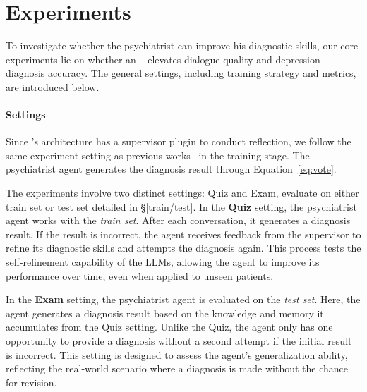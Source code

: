 
\section{Experiments}
\label{sec:exp}


To investigate whether the psychiatrist can improve his diagnostic skills, our core experiments lie on whether an \system~ elevates dialogue quality and depression diagnosis accuracy. The general settings, including training strategy and metrics, are introduced below.


\paragraph{Settings}
Since \system's architecture has a supervisor plugin to conduct reflection, we follow the same experiment setting as previous works~\cite{shinn2023reflexion, renze2024selfreflectionllmagentseffects} in the training stage. The psychiatrist agent generates the diagnosis result through Equation~\ref{eq:vote}.


The experiments involve two distinct settings: Quiz and Exam, evaluate on either train set or test set detailed in \S\ref{train/test}. In the \textbf{Quiz} setting, the psychiatrist agent works with the \textit{train set}. After each conversation, it generates a diagnosis result. If the result is incorrect, the agent receives feedback from the supervisor to refine its diagnostic skills and attempts the diagnosis again. This process tests the self-refinement capability of the LLMs, allowing the agent to improve its performance over time, even when applied to unseen patients.

In the \textbf{Exam} setting, the psychiatrist agent is evaluated on the \textit{test set}. Here, the agent generates a diagnosis result based on the knowledge and memory it accumulates from the Quiz setting. Unlike the Quiz, the agent only has one opportunity to provide a diagnosis without a second attempt if the initial result is incorrect. This setting is designed to assess the agent's generalization ability, reflecting the real-world scenario where a diagnosis is made without the chance for revision.

